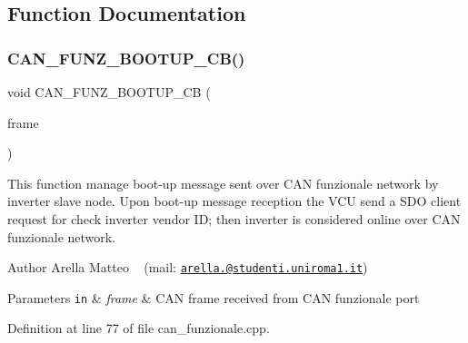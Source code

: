 \subsection{Function Documentation}
\mbox{\label{group___c_a_n__funzionale__group_gaf4990e00c0c4a9f9eeb9cb5bdaecfa94}} 
\subsubsection{\texorpdfstring{C\+A\+N\+\_\+\+F\+U\+N\+Z\+\_\+\+B\+O\+O\+T\+U\+P\+\_\+\+C\+B()}{CAN\_FUNZ\_BOOTUP\_CB()}}
{\footnotesize\ttfamily void C\+A\+N\+\_\+\+F\+U\+N\+Z\+\_\+\+B\+O\+O\+T\+U\+P\+\_\+\+CB (\begin{DoxyParamCaption}\item[{C\+A\+N\+\_\+\+F\+R\+A\+ME $\ast$}]{frame }\end{DoxyParamCaption})}



This function manage boot-\/up message sent over C\+AN funzionale network by inverter slave node. Upon boot-\/up message reception the V\+CU send a S\+DO client request for check inverter vendor ID; then inverter is considered online over C\+AN funzionale network. 

\begin{DoxyAuthor}{Author}
Arella Matteo ~\newline
 (mail\+: \href{mailto:arella.1646983@studenti.uniroma1.it}{\tt arella.@studenti.\+uniroma1.\+it})
\end{DoxyAuthor}

\begin{DoxyParams}[1]{Parameters}
\mbox{\tt in}  & {\em frame} & C\+AN frame received from C\+AN funzionale port \\
\hline
\end{DoxyParams}


Definition at line 77 of file can\+\_\+funzionale.\+cpp.

\mbox{\label{group___c_a_n__funzionale__group_ga1fcfa8e31cfbfe2461328c345b5b8e19}} 
